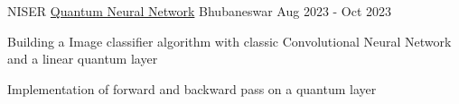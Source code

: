 

\begin{cventries}
	
  \cventry
{NISER} %
{\href{https://github.com/pritipriya-dasbehera/QNN_CP}{Quantum Neural Network}} %
{Bhubaneswar} %
{Aug 2023 - Oct 2023} %
{
	\begin{cvitems} %
		\item {Building a Image classifier algorithm with classic Convolutional Neural Network and a linear quantum layer}
		\item {Implementation of forward and backward pass on a quantum layer}
	\end{cvitems}
}
%

\end{cventries}

